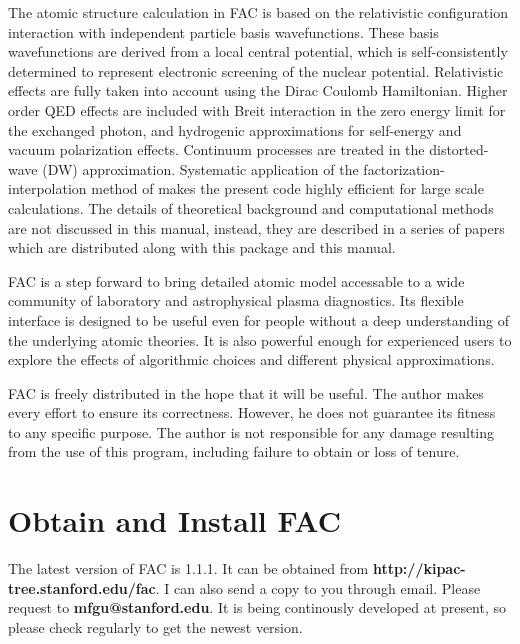 \documentclass[twoside,letterpaper]{refrep}
\newcommand{\facversion}{{1.1.1}\xspace}
\begin{document}
The atomic structure calculation in FAC is based on the relativistic
configuration interaction with independent particle basis wavefunctions. These
basis wavefunctions are derived from a local central potential, which is
self-consistently determined to represent electronic screening of the nuclear
potential. Relativistic effects are fully taken into account using the Dirac
Coulomb Hamiltonian. Higher order QED effects are included with Breit
interaction in the zero energy limit for the exchanged photon, and hydrogenic
approximations for self-energy and vacuum polarization effects. 
Continuum processes are treated
in the distorted-wave (DW) approximation. Systematic application of the
factorization-interpolation method of \citet{barshalom88} makes the present
code highly efficient for large scale calculations. The details of theoretical
background and computational methods are not discussed in this manual,
instead, they are described in a series of papers which are distributed along
with this package and this manual.

FAC is a step forward to bring detailed atomic model accessable to a wide
community of laboratory and astrophysical plasma diagnostics. Its flexible
interface is designed to be useful even for people without a deep
understanding of the underlying atomic theories. It is also powerful enough
for experienced users to explore the effects of algorithmic choices and
different physical approximations.

FAC is freely distributed in the hope that it will be useful. The author makes
every effort to ensure its correctness. However, he does not guarantee its
fitness to any specific purpose. The author is not responsible for any damage
resulting from the use of this program, including failure to obtain or loss of
tenure. 

\section{Obtain and Install FAC}
\label{sec:install}
The latest version of FAC is \facversion. It can be obtained from
\textbf{http://kipac-tree.stanford.edu/fac}. I can also send a copy to you
through email. Please request to \textbf{mfgu@stanford.edu}. It is being
continously developed at present, so please check regularly to get the newest
version.
\end{document}
